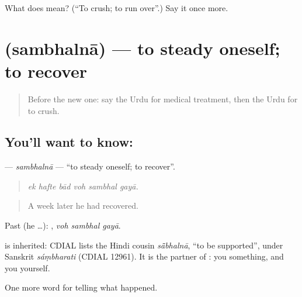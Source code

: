\begin{tcolorbox}[breakable,colback=teal!4,colframe=teal!35!black,title={Before you move on}]
What does  mean? (\textquotedblleft{}To crush; to run over\textquotedblright{}.) Say it once more.
\end{tcolorbox}
\section[\texorpdfstring{\ur{سنبھلنا} (sambhalnā)}{سنبھلنا (sambhalnā)}]{ (sambhalnā) — to steady oneself; to recover}

\label{lesson:UR-C286-sambhalna-oneself}



\begin{quote}
Before the new one: say the Urdu for medical treatment, then the Urdu for to crush.
\end{quote}

\subsection*{You'll want to know: }
\textbf{} — \emph{sambhalnā} — \textquotedblleft{}to steady oneself; to recover\textquotedblright{}.

\begin{quote}
     
\end{quote}

\begin{quote}
\emph{ek hafte bād voh sambhal gayā.}
\end{quote}

\begin{quote}
A week later he had recovered.
\end{quote}

Past (he …):   , \emph{voh sambhal gayā}.

\begin{cousinweb}
is inherited: CDIAL lists the Hindi cousin \emph{sā̃bhalnā}, \textquotedblleft{}to be supported\textquotedblright{}, under Sanskrit \emph{sáṃbharati} (CDIAL 12961). It is the partner of \textbf{}: you \textbf{} something, and you \textbf{} yourself.
\end{cousinweb}

\begin{grammarlens}[title={What you've built}]
One more word for telling what happened.
\end{grammarlens}

